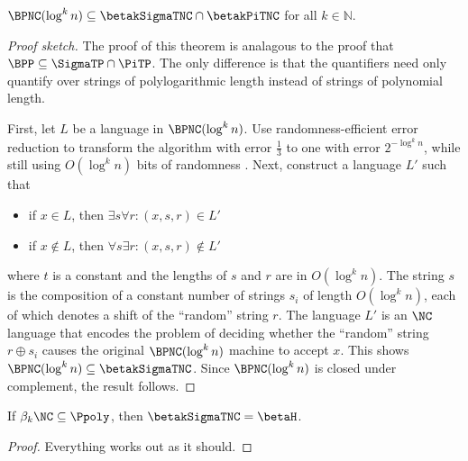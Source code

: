 \documentclass{article}
\begin{document}
\begin{theorem}
  $\BPNC(\log^k n) \subseteq \betakSigmaTNC \cap \betakPiTNC$ for all $k \in \mathbb{N}$.
\end{theorem}
\begin{proof}[Proof sketch]
  The proof of this theorem is analagous to the proof that $\BPP \subseteq \SigmaTP \cap \PiTP$.
  The only difference is that the quantifiers need only quantify over strings of polylogarithmic length instead of strings of polynomial length.

  First, let $L$ be a language in $\BPNC(\log^k n)$.
  Use randomness-efficient error reduction to transform the algorithm with error $\frac{1}{3}$ to one with error $2^{-\log^k n}$, while still using $O(\log^k n)$ bits of randomness \autocite[Corollary~1.4]{healy08}.
  Next, construct a language $L'$ such that
  \begin{itemize}
  \item if $x \in L$, then $\exists s \forall r \colon (x, s, r) \in L'$
  \item if $x \notin L$, then $\forall s \exists r \colon (x, s, r) \notin L'$
  \end{itemize}
  where $t$ is a constant and the lengths of $s$ and $r$ are in $O(\log^k n)$.
  The string $s$ is the composition of a constant number of strings $s_i$ of length $O(\log^k n)$, each of which denotes a shift of the ``random'' string $r$.
  The language $L'$ is an $\NC$ language that encodes the problem of deciding whether the ``random'' string $r \oplus s_i$ causes the original $\BPNC(\log^k n)$ machine to accept $x$.
  This shows $\BPNC(\log^k n) \subseteq \betakSigmaTNC$.
  Since $\BPNC(\log^k n)$ is closed under complement, the result follows.
\end{proof}


\begin{theorem}
  If $\beta_k \NC \subseteq \Ppoly$, then $\betakSigmaTNC = \betaH$.
\end{theorem}
\begin{proof}
  Everything works out as it should.
\end{proof}

\printbibliography
\end{document}

